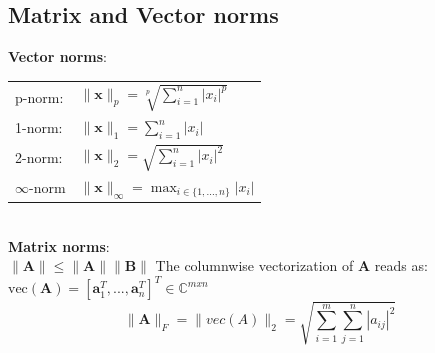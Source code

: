 \documentclass[english]{latex4ei/latex4ei_sheet}
\begin{document}
\begin{sectionbox}
    \subsection{Matrix and Vector norms}
    \textbf{Vector norms}:\\

    \begin{tabular*}{\columnwidth}{ll}
        p-norm: & $\parallel\mathbf{x}\parallel_p = \sqrt[p]{\sum_{i=1}^{n} |x_i|^p}$\\
        1-norm: & $\parallel\mathbf{x}\parallel_1 = \sum_{i=1}^{n} |x_i|$\\
        2-norm: & $\parallel\mathbf{x}\parallel_2 = \sqrt{\sum_{i=1}^{n} |x_i|^2}$\\
        $\infty$-norm & $\parallel\mathbf{x}\parallel_\infty = \max_{i\in\{1,...,n\}} |x_i|$\\
    \end{tabular*}\\

    \textbf{Matrix norms}:\\
    $\parallel \mathbf{A}\parallel \leq \parallel \mathbf{A}\parallel \parallel\mathbf{B}\parallel$
    The columnwise vectorization of $\mathbf{A}$ reads as:\\
    $\text{vec}(\mathbf{A}) = [\mathbf{a}_1^T, ...,\mathbf{a}_n^T]^T\in\mathbb{C}^{mxn}$\\

    $$\parallel\mathbf{A}\parallel_F = \parallel vec(A)\parallel_2 = \sqrt{\sum_{i=1}^{m}\sum_{j=1}^{n} |a_{ij}|^2}$$
\end{sectionbox}
\end{document}
